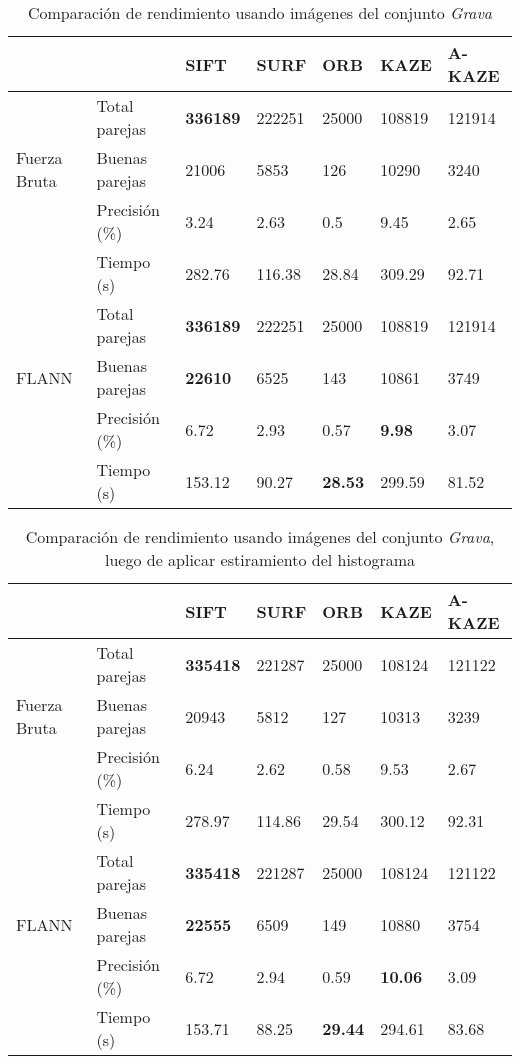 \begin{table}[h]
	\centering
	\caption{Comparación de rendimiento usando imágenes del conjunto \textit{Grava}}
	\label{geotagg}
	\begin{tabular}{@{}lllllll@{}}
		\toprule
		&                      				& SIFT 			& SURF & ORB & KAZE  & A-KAZE  \\ \midrule 
			   \hfill\vline& Total parejas  &\textbf{336189}& 222251&25000&108819& 121914   \\
		Fuerza Bruta \vline& Buenas parejas & 21006			& 5853 & 126 & 10290 & 3240  \\
			   \hfill\vline& Precisión (\%) & 3.24			&2.63  & 0.5   & 9.45& 2.65  \\
				\vspace{0.3cm}
			   \hfill\vline& Tiempo (s)     & 282.76		&116.38 & 28.84 &309.29 & 92.71   \\
		
			   \hfill\vline& Total parejas  &\textbf{336189}& 222251&25000			&108819				& 121914   \\
		FLANN  \hfill\vline& Buenas parejas &\textbf{22610} & 6525 & 143			& 10861				& 3749    \\
			   \hfill\vline& Precisión (\%) & 6.72			& 2.93 &0.57  			& \textbf{9.98} 	& 3.07    \\ 
			   \hfill\vline& Tiempo (s)     & 153.12		& 90.27& \textbf{28.53}	& 299.59			& 81.52   \\ 
		\bottomrule
	\end{tabular}
\end{table}
\begin{table}[h]
	\centering
	\caption{Comparación de rendimiento usando imágenes del conjunto \textit{Grava}, luego de aplicar estiramiento del histograma}
	\label{geotagg-2}
	\begin{tabular}{@{}lllllll@{}}
		\toprule
		&                      				& SIFT 			& SURF & ORB & KAZE  & A-KAZE  \\ \midrule 
		\hfill\vline& Total parejas  &\textbf{335418}		& 221287&25000&108124& 121122   \\
		Fuerza Bruta \vline& Buenas parejas & 20943			& 5812 & 127 & 10313 & 3239  \\
		\hfill\vline& Precisión (\%) & 6.24			&2.62  & 0.58  & 9.53& 2.67  \\
		\vspace{0.3cm}
		\hfill\vline& Tiempo (s)     & 278.97		&114.86 & 29.54 &300.12 & 92.31   \\
		
		\hfill\vline& Total parejas  &\textbf{335418}& 221287&25000			&108124				& 121122   \\
		FLANN  \hfill\vline& Buenas parejas &\textbf{22555} & 6509 & 149	& 10880				& 3754    \\
		\hfill\vline& Precisión (\%) & 6.72			& 2.94 &0.59  			& \textbf{10.06} 	& 3.09   \\ 
		\hfill\vline& Tiempo (s)     & 153.71		& 88.25& \textbf{29.44}	& 294.61			& 83.68   \\ 
		\bottomrule
	\end{tabular}
\end{table}

